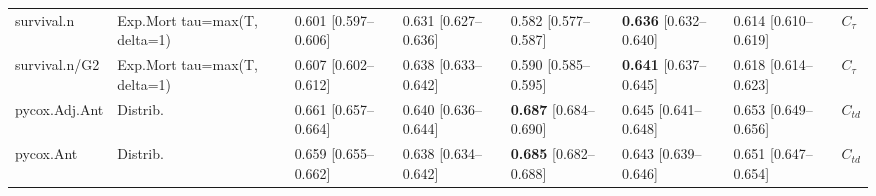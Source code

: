 \begin{tabular}{llllllll}
survival.n & Exp.Mort tau=max(T, delta=1) & 0.601 [0.597–0.606] & 0.631 [0.627–0.636] & 0.582 [0.577–0.587] & \textbf{0.636} [0.632–0.640] & 0.614 [0.610–0.619] & $C_{\tau}$\\
survival.n/G2 & Exp.Mort tau=max(T, delta=1) & 0.607 [0.602–0.612] & 0.638 [0.633–0.642] & 0.590 [0.585–0.595] & \textbf{0.641} [0.637–0.645] & 0.618 [0.614–0.623] & $C_{\tau}$\\
pycox.Adj.Ant & Distrib. & 0.661 [0.657–0.664] & 0.640 [0.636–0.644] & \textbf{0.687} [0.684–0.690] & 0.645 [0.641–0.648] & 0.653 [0.649–0.656] & $C_{td}$\\
\addlinespace
pycox.Ant & Distrib. & 0.659 [0.655–0.662] & 0.638 [0.634–0.642] & \textbf{0.685} [0.682–0.688] & 0.643 [0.639–0.646] & 0.651 [0.647–0.654] & $C_{td}$\\
\bottomrule
\end{tabular}

